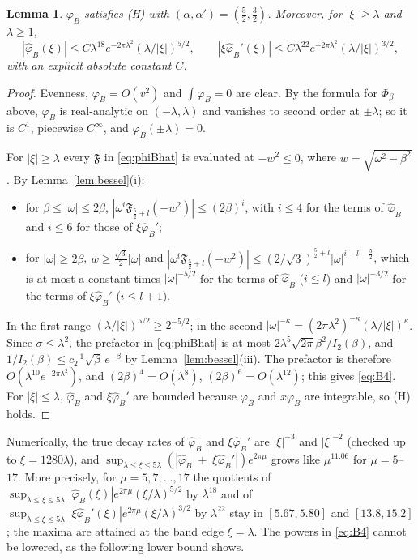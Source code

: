 \documentclass[11pt]{amsart}
\newtheorem{lemma}[proposition]{Lemma}
\theoremstyle{definition}
\theoremstyle{remark}
\numberwithin{equation}{section}
\newcommand{\F}{\mathfrak{F}}
\begin{document}
\begin{lemma}\label{lem:B3}
$\varphi_B$ satisfies (H) with $(\alpha,\alpha')=(\frac52,\frac32)$. Moreover, for $|\xi|\ge\lambda$ and $\lambda\ge1$,
\begin{equation}\label{eq:B4}
|\hat\varphi_B(\xi)|\le C\lambda^{18}e^{-2\pi\lambda^2}(\lambda/|\xi|)^{5/2},\qquad |\xi\hat\varphi_B'(\xi)|\le C\lambda^{22}e^{-2\pi\lambda^2}(\lambda/|\xi|)^{3/2},
\end{equation}
with an explicit absolute constant $C$.
\end{lemma}
\begin{proof}
Evenness, $\varphi_B=O(v^2)$ and $\int\varphi_B=0$ are clear. By the formula for $\Phi_\beta$ above, $\varphi_B$ is real-analytic on $(-\lambda,\lambda)$ and vanishes to second order at $\pm\lambda$; so it is $C^1$, piecewise $C^\infty$, and $\varphi_B(\pm\lambda)=0$.

For $|\xi|\ge\lambda$ every $\F$ in \eqref{eq:phiBhat} is evaluated at $-w^2\le0$, where $w=\sqrt{\omega^2-\beta^2}$. By Lemma~\ref{lem:bessel}(i):
\begin{itemize}
\item for $\beta\le|\omega|\le2\beta$, $|\omega^i\F_{\frac52+l}(-w^2)|\le(2\beta)^i$, with $i\le4$ for the terms of $\hat\varphi_B$ and $i\le6$ for those of $\xi\hat\varphi_B'$;
\item for $|\omega|\ge2\beta$, $w\ge\frac{\sqrt3}2|\omega|$ and $|\omega^i\F_{\frac52+l}(-w^2)|\le(2/\sqrt3)^{\frac52+l}|\omega|^{i-l-\frac52}$, which is at most a constant times $|\omega|^{-5/2}$ for the terms of $\hat\varphi_B$ ($i\le l$) and $|\omega|^{-3/2}$ for the terms of $\xi\hat\varphi_B'$ ($i\le l+1$).
\end{itemize}
In the first range $(\lambda/|\xi|)^{5/2}\ge2^{-5/2}$; in the second $|\omega|^{-\kappa}=(2\pi\lambda^2)^{-\kappa}(\lambda/|\xi|)^\kappa$. Since $\sigma\le\lambda^2$, the prefactor in \eqref{eq:phiBhat} is at most $2\lambda^5\sqrt{2\pi}\beta^2/I_2(\beta)$, and $1/I_2(\beta)\le c_2^{-1}\sqrt\beta\,e^{-\beta}$ by Lemma~\ref{lem:bessel}(iii). The prefactor is therefore $O(\lambda^{10}e^{-2\pi\lambda^2})$, and $(2\beta)^4=O(\lambda^8)$, $(2\beta)^6=O(\lambda^{12})$; this gives \eqref{eq:B4}. For $|\xi|\le\lambda$, $\hat\varphi_B$ and $\xi\hat\varphi_B'$ are bounded because $\varphi_B$ and $x\varphi_B$ are integrable, so (H) holds.
\end{proof}
Numerically, the true decay rates of $\hat\varphi_B$ and $\xi\hat\varphi_B'$ are $|\xi|^{-3}$ and $|\xi|^{-2}$ (checked up to $\xi=1280\lambda$), and $\sup_{\lambda\le\xi\le5\lambda}(|\hat\varphi_B|+|\xi\hat\varphi_B'|)e^{2\pi\mu}$ grows like $\mu^{11.06}$ for $\mu=5$--$17$. More precisely, for $\mu=5,7,\dots,17$ the quotients of $\sup_{\lambda\le\xi\le5\lambda}|\hat\varphi_B(\xi)|e^{2\pi\mu}(\xi/\lambda)^{5/2}$ by $\lambda^{18}$ and of $\sup_{\lambda\le\xi\le5\lambda}|\xi\hat\varphi_B'(\xi)|e^{2\pi\mu}(\xi/\lambda)^{3/2}$ by $\lambda^{22}$ stay in $[5.67,5.80]$ and $[13.8,15.2]$; the maxima are attained at the band edge $\xi=\lambda$. The powers in \eqref{eq:B4} cannot be lowered, as the following lower bound shows.
\end{document}
